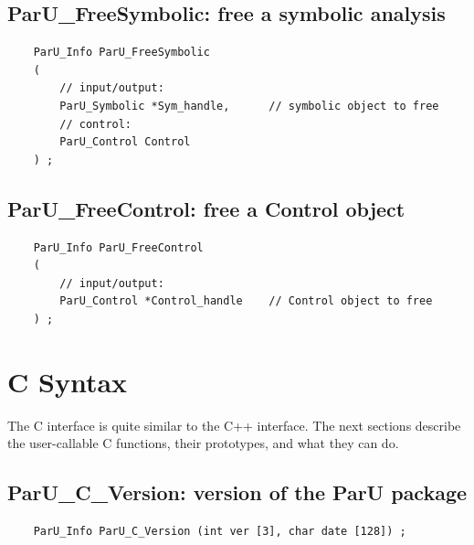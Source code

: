 \documentclass[12pt]{article}
\begin{document}
\subsection{{\sf ParU\_FreeSymbolic}: free a symbolic analysis}

    {\footnotesize
    \begin{verbatim}
    ParU_Info ParU_FreeSymbolic
    (
        // input/output:
        ParU_Symbolic *Sym_handle,      // symbolic object to free
        // control:
        ParU_Control Control
    ) ; \end{verbatim} }

\subsection{{\sf ParU\_FreeControl}: free a Control object}

    {\footnotesize
    \begin{verbatim}
    ParU_Info ParU_FreeControl
    (
        // input/output:
        ParU_Control *Control_handle    // Control object to free
    ) ; \end{verbatim} }

\section{C Syntax}

The C interface is quite similar to the C++ interface.  The next sections
describe the user-callable C functions, their prototypes, and what they can do.

\subsection{{\sf ParU\_C\_Version}: version of the ParU package}

    {\footnotesize
    \begin{verbatim}
    ParU_Info ParU_C_Version (int ver [3], char date [128]) ; \end{verbatim} }
\end{document}
